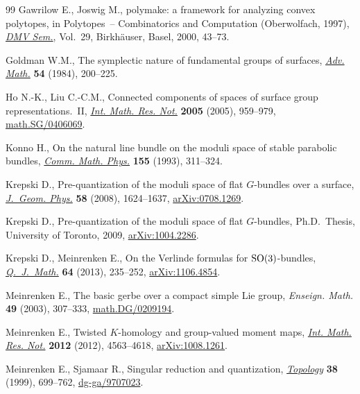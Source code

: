 \documentclass[pdftex]{sigma}
\numberwithin{equation}{section}
\begin{document}
\begin{thebibliography}{99}
Gawrilow E., Joswig M., polymake: a framework for analyzing convex polytopes,
  in Polytopes~-- Combinatorics and Computation ({O}berwolfach, 1997),
  \href{http://dx.doi.org/10.1007/978-3-0348-8438-9_2}{\textit{DMV Sem.}}, Vol.~29, Birkh\"auser, Basel, 2000, 43--73.

Goldman W.M., The symplectic nature of fundamental groups of surfaces,
  \href{http://dx.doi.org/10.1016/0001-8708(84)90040-9}{\textit{Adv. Math.}} \textbf{54} (1984), 200--225.

Ho N.-K., Liu C.-C.M., Connected components of spaces of surface group
  representations.~{II}, \href{http://dx.doi.org/10.1155/IMRN.2005.959}{\textit{Int. Math. Res. Not.}} \textbf{2005} (2005),
  959--979, \href{http://arxiv.org/abs/math.SG/0406069}{math.SG/0406069}.

Konno H., On the natural line bundle on the moduli space of stable parabolic
  bundles, \href{http://dx.doi.org/10.1007/BF02097396}{\textit{Comm. Math. Phys.}} \textbf{155} (1993), 311--324.

Krepski D., Pre-quantization of the moduli space of f\/lat {$G$}-bundles over a
  surface, \href{http://dx.doi.org/10.1016/j.geomphys.2008.07.009}{\textit{J.~Geom. Phys.}} \textbf{58} (2008), 1624--1637,
  \href{http://arxiv.org/abs/0708.1269}{arXiv:0708.1269}.

Krepski D., Pre-quantization of the moduli space of f\/lat {$G$}-bundles, Ph.D.\
  Thesis, University of Toronto, 2009, \href{http://arxiv.org/abs/1004.2286}{arXiv:1004.2286}.

Krepski D., Meinrenken E., On the {V}erlinde formulas for {${\rm
  SO}(3)$}-bundles, \href{http://dx.doi.org/10.1093/qmath/har040}{\textit{Q.~J.~Math.}} \textbf{64} (2013), 235--252,
  \href{http://arxiv.org/abs/1106.4854}{arXiv:1106.4854}.

Meinrenken E., The basic gerbe over a compact simple {L}ie group,
  \textit{Enseign. Math.} \textbf{49} (2003), 307--333,
  \href{http://arxiv.org/abs/math.DG/0209194}{math.DG/0209194}.

Meinrenken E., Twisted {$K$}-homology and group-valued moment maps,
  \href{http://dx.doi.org/10.1093/imrn/rnr197}{\textit{Int. Math. Res. Not.}} \textbf{2012} (2012), 4563--4618, \href{http://arxiv.org/abs/1008.1261}{arXiv:1008.1261}.

Meinrenken E., Sjamaar R., Singular reduction and quantization,
  \href{http://dx.doi.org/10.1016/S0040-9383(98)00012-3}{\textit{Topology}} \textbf{38} (1999), 699--762, \mbox{\href{http://arxiv.org/abs/dg-ga/9707023}{dg-ga/9707023}}.


\end{thebibliography}
\end{document}
